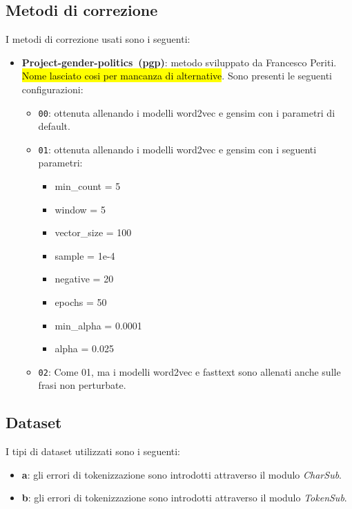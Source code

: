 \documentclass[12pt]{article}
\begin{document}
\subsection{Metodi di correzione}
I metodi di correzione usati sono i seguenti:
\begin{itemize}
	\newcommand{\pgp}{pgp}
	\newcommand{\pgpfull}{Project-gender-politics}
	\item \textbf{\pgpfull\ (pgp)}: metodo sviluppato da Francesco Periti. \hl{Nome lasciato cosi per mancanza di alternative}. Sono presenti le seguenti configurazioni:
	      \begin{itemize}
		      \item \texttt{00}: ottenuta allenando i modelli word2vec e gensim con i parametri di default.
		      \item \texttt{01}: ottenuta allenando i modelli word2vec e gensim con i seguenti parametri:
		            \begin{itemize}
			            \item min\_count = 5
			            \item window = 5
			            \item vector\_size = 100
			            \item sample = 1e-4
			            \item negative = 20
			            \item epochs = 50
			            \item min\_alpha = 0.0001
			            \item alpha = 0.025
		            \end{itemize}
		      \item \texttt{02}: Come 01, ma i modelli word2vec e fasttext sono allenati anche sulle frasi non perturbate.
	      \end{itemize}
\end{itemize}



\subsection{Dataset}

I tipi di dataset utilizzati sono i seguenti:
\begin{itemize}
	\item \textbf{a}: gli errori di tokenizzazione sono introdotti attraverso il modulo \textit{CharSub}.
	\item \textbf{b}: gli errori di tokenizzazione sono introdotti attraverso il modulo \textit{TokenSub}.
\end{itemize}
\end{document}
